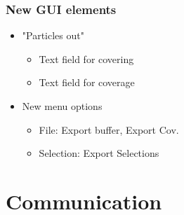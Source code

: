 \subsubsection{New GUI elements}
\begin{itemize}[noitemsep,topsep=0pt]
\item "Particles out" %
\begin{itemize}[noitemsep,topsep=0pt]
\item Text field for covering
\item Text field for coverage
\end{itemize}
\item New menu options
\begin{itemize}[noitemsep,topsep=0pt]
\item File: Export buffer, Export Cov.%
\item Selection: Export Selections
\end{itemize}
\end{itemize}

\section{Communication}

